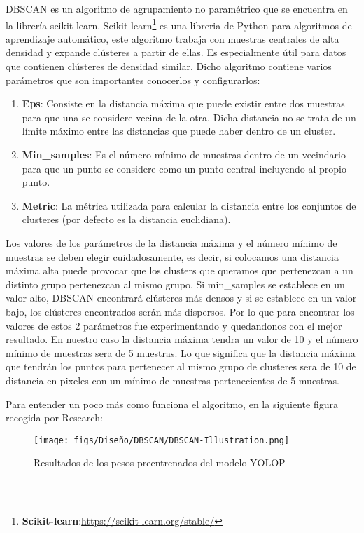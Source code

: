 DBSCAN es un algoritmo de agrupamiento no paramétrico que se encuentra en la librería scikit-learn. Scikit-learn\footnote{\textbf{Scikit-learn}:\url{https://scikit-learn.org/stable/}} es una libreria de Python para algoritmos de aprendizaje automático,
este algoritmo trabaja con muestras centrales de alta densidad y expande clústeres a partir de ellas. Es especialmente útil para datos que contienen clústeres de densidad similar.
\newline
Dicho algoritmo contiene varios parámetros que son importantes conocerlos y configurarlos: 
\begin{enumerate}
  \item \textbf{Eps}: Consiste en la distancia máxima que puede existir entre dos muestras para que una se considere vecina de la otra. Dicha distancia no se trata de un límite 
  máximo entre las distancias que puede haber dentro de un cluster.
  \item \textbf{Min\_samples}: Es el número mínimo de muestras dentro de un vecindario para que un punto se considere como un punto central incluyendo al propio punto.
  \item \textbf{Metric}: La métrica utilizada para calcular la distancia entre los conjuntos de clusteres (por defecto es la distancia euclidiana). 
\end{enumerate}
Los valores de los parámetros de la distancia máxima y el número mínimo de muestras se deben elegir cuidadosamente, es decir, si colocamos una distancia 
máxima alta puede provocar que los clusters que queramos que pertenezcan a un distinto grupo pertenezcan al mismo grupo. 
Si min\_samples se establece en un valor alto, DBSCAN encontrará clústeres más densos y 
si se establece en un valor bajo, los clústeres encontrados serán más dispersos.
\break
Por lo que para encontrar los valores de estos 2 parámetros fue experimentando y quedandonos con el mejor resultado. En nuestro caso la distancia máxima tendra un valor de 10 
y el número mínimo de muestras sera de 5 muestras. Lo que significa que la distancia máxima que tendrán los puntos para pertenecer al mismo grupo de clusteres sera de 10 de distancia en pixeles
con un mínimo de muestras pertenecientes de 5 muestras. 

Para entender un poco más como funciona el algoritmo, en la siguiente figura recogida por Research: 

\begin{figure} [H]
  \begin{center}
    \texttt{[image: figs/Diseño/DBSCAN/DBSCAN-Illustration.png]}
  \end{center}
  \caption{Resultados de los pesos preentrenados del modelo YOLOP}
  \label{fig:pesos_preentrenados}
\end{figure}\

